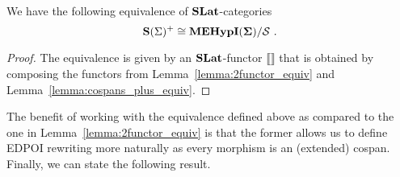 

\begin{theorem}
	\label{thm:completeness_simple}
	We have the following equivalence of $\mathbf{SLat}$-categories
	\vspace{-2mm}
	\[
		\catname{S}(\Sigma)^{+} \cong \WellTypedMdaEcospans / \mathcal{S}~.
	\vspace{-1mm}
	\]	
	\end{theorem}
\begin{proof}
	The equivalence is given by an $\mathbf{SLat}$-functor $\llbracket \rrbracket$ that is obtained by composing the functors from Lemma~\ref{lemma:2functor_equiv} and Lemma~\ref{lemma:cospans_plus_equiv}.
\end{proof}
\vspace{-2mm}
The benefit of working with the equivalence defined above as compared to the one in Lemma~\ref{lemma:2functor_equiv} is that the former allows us to define EDPOI rewriting more naturally as every morphism is an (extended) cospan.
Finally, we can state the following result.



